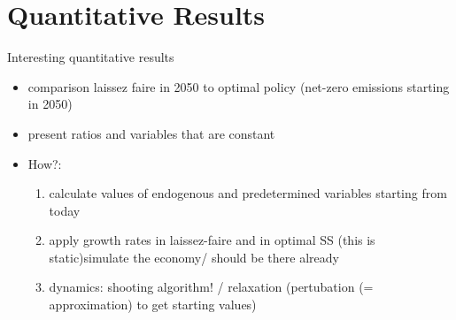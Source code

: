 \section{Quantitative Results}

Interesting quantitative results

\begin{itemize}
	\item comparison laissez faire in 2050 to optimal policy (net-zero emissions starting in 2050)
	\item present ratios and variables that are constant 
	\item How?: 
	\begin{enumerate}
	\item calculate values of endogenous and predetermined variables starting from today
	\item apply growth rates in laissez-faire and in optimal SS (this is static)\ar simulate the economy/ should be there already
	\item dynamics: shooting algorithm! / relaxation (pertubation (= approximation) to get starting values)
	\end{enumerate}
\end{itemize}